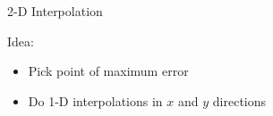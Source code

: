 \documentclass[xcolor={rgb,dvipsnames}]{beamer}		%
\begin{document}



\begin{frame}{2-D Interpolation}
\begin{block}{Idea:}
\begin{itemize}
\item Pick point of maximum error
\item Do 1-D interpolations in $x$ and $y$ directions
\end{itemize}
\end{block}
    \centering
\end{frame}


\end{document}
